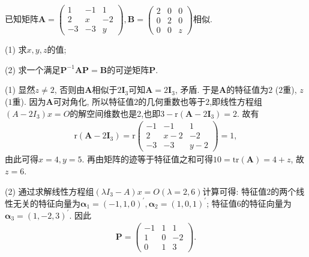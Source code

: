 \documentclass[../../main.tex]{subfiles}%
\begin{document}
\begin{example}
已知矩阵\(\boldsymbol{A}=\begin{pmatrix}
1&-1&1\\
2&x&-2\\
-3&-3&y
\end{pmatrix},\boldsymbol{B}=\begin{pmatrix}
2&0&0\\
0&2&0\\
0&0&z
\end{pmatrix}\)相似.

(1) 求\(x,y,z\)的值;

(2) 求一个满足\(\boldsymbol{P}^{-1}\boldsymbol{AP}=\boldsymbol{B}\)的可逆矩阵\(\boldsymbol{P}\). 
\end{example}
\begin{solution}

(1) 显然\(z\neq 2\), 否则由\(\boldsymbol{A}\)相似于\(2\boldsymbol{I}_{3}\)可知\(\boldsymbol{A}=2\boldsymbol{I}_{3}\), 矛盾. 于是\(\boldsymbol{A}\)的特征值为\(2\) (\(2\)重), \(z\) (\(1\)重). 因为\(\boldsymbol{A}\)可对角化, 所以特征值\(2\)的几何重数也等于\(2\),即线性方程组$(A-2I_3)x=O$的解空间维数也是2,也即$3-\mathrm{r}(\boldsymbol{A}-2\boldsymbol{I}_{3})=2$. 故有
\begin{align*}
\mathrm{r}(\boldsymbol{A}-2\boldsymbol{I}_{3})=\mathrm{r}\begin{pmatrix}
-1&-1&1\\
2&x - 2&-2\\
-3&-3&y - 2
\end{pmatrix}=1,
\end{align*}
由此可得\(x = 4,y = 5\). 再由矩阵的迹等于特征值之和可得\(10=\mathrm{tr}(\boldsymbol{A})=4 + z\), 故\(z = 6\).

(2) 通过求解线性方程组$(\lambda I_3-A)x=O(\lambda=2,6)$计算可得: 特征值\(2\)的两个线性无关的特征向量为\(\boldsymbol{\alpha}_{1}=(-1,1,0)^{\prime},\boldsymbol{\alpha}_{2}=(1,0,1)^{\prime}\); 特征值\(6\)的特征向量为\(\boldsymbol{\alpha}_{3}=(1,-2,3)^{\prime}\). 因此
\begin{align*}
\boldsymbol{P}=\begin{pmatrix}
-1&1&1\\
1&0&-2\\
0&1&3
\end{pmatrix}. 
\end{align*}

\end{solution}
\end{document}
